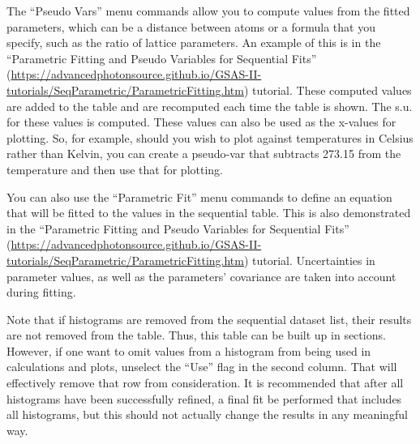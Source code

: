 The ``Pseudo Vars'' menu commands allow you to compute values from the fitted parameters, which can be a distance between atoms or a formula that you specify, such as the ratio of lattice parameters. An example of this is in the 
``Parametric Fitting and Pseudo Variables for Sequential Fits'' (\url{https://advancedphotonsource.github.io/GSAS-II-tutorials/SeqParametric/ParametricFitting.htm}) tutorial. These computed values are added to the table and are recomputed each time the table is shown. The s.u. for these values is computed. These values can also be used as the x-values for plotting. So, for example, should you wish to plot against temperatures in Celsius rather than Kelvin, you can create a pseudo-var that subtracts 273.15 from the temperature and then use that for plotting. 

You can also use the ``Parametric Fit'' menu commands to define an equation that will be fitted to the values in the sequential table. This is also demonstrated in the ``Parametric Fitting and Pseudo Variables for Sequential Fits'' (\url{https://advancedphotonsource.github.io/GSAS-II-tutorials/SeqParametric/ParametricFitting.htm}) tutorial. Uncertainties in parameter values, as well as the parameters' covariance are taken into account during fitting. 

Note that if histograms are removed from the sequential dataset list, their results are not removed from the table. Thus, this table can be built up in sections. However, if one want to omit values from a histogram from being used in calculations and plots, unselect the ``Use'' flag in the second column. That will effectively remove that row from consideration. 
It is recommended that after all histograms have been successfully refined, a final fit be performed that includes all histograms, but this should not actually change the results in any meaningful way. 

